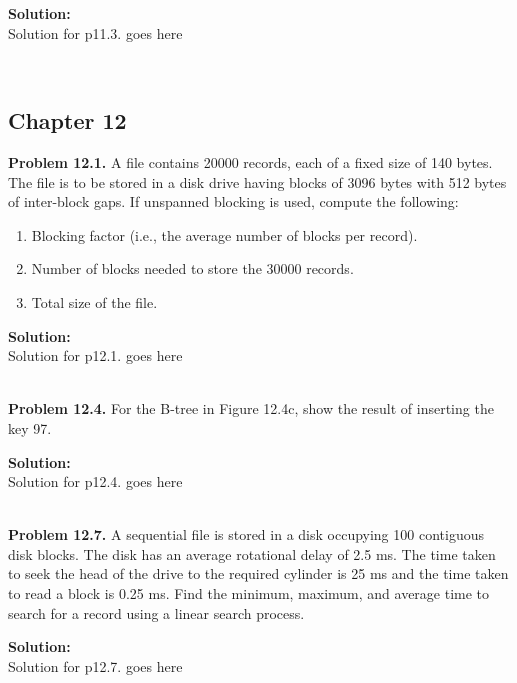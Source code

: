 \documentclass[12pt]{article}
\newcommand{\Problem}[1]{%
	\textbf{Problem #1.}%
}
\newcommand\Solution{%
	\noindent \textbf{Solution:}\\%
}
\begin{document}
\Solution Solution for p11.3. goes here

~\\
\subsection*{Chapter 12}

\Problem{12.1} A file contains 20000 records, each of a fixed size of 140 bytes. The file is to be stored in a disk drive having blocks of 3096 bytes with 512 bytes of inter-block gaps. If unspanned blocking is used, compute the following:
	\begin{enumerate}[label=\textbf{\alph*}.]
		\item Blocking factor (i.e., the average number of blocks per record).
		\item Number of blocks needed to store the 30000 records.
		\item Total size of the file.
	\end{enumerate}
	
\Solution Solution for p12.1. goes here

~\\
\Problem{12.4} For the B-tree in Figure 12.4c, show the result of inserting the key 97.
	\begin{figure}[H]

	\end{figure}
	
\Solution Solution for p12.4. goes here

~\\
\Problem{12.7} A sequential file is stored in a disk occupying 100 contiguous disk blocks. The disk has an average rotational delay of 2.5 ms. The time taken to seek the head of the drive to the required cylinder is 25 ms and the time taken to read a block is 0.25 ms. Find the minimum, maximum, and average time to search for a record using a linear search process.

\Solution Solution for p12.7. goes here
\end{document}
